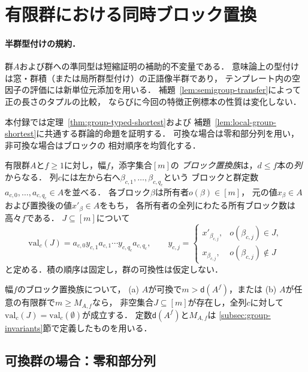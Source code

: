 \section{有限群における同時ブロック置換}
\label{app:group-blocks}

\paragraph{半群型付けの規約．}
群$A$および群への準同型は短縮証明の補助的不変量である．
意味論上の型付けは窓・群積（または局所群型付け）の正語像半群であり，
テンプレート内の空因子の評価には新単位元添加を用いる．
補題~\ref{lem:semigroup-transfer}によって正の長さのタプルの比較，
ならびに今回の特徴正例標本の性質は変化しない．

本付録では定理~\ref{thm:group-typed-shortest}および
補題~\ref{lem:local-group-shortest}に共通する群論的命題を証明する．
可換な場合は零和部分列を用い，非可換な場合はブロックの
相対順序を均質化する．

\begin{definition}[ブロック置換族]
\label{def:block-family}
有限群$A$と$f\ge1$に対し，幅$f$，添字集合$[m]$の
\emph{ブロック置換族}は，$d\le f$本の\emph{列}からなる．
列$c$には左から右へ$\beta_{c,1},\ldots,\beta_{c,q_c}$という
ブロックと群定数$a_{c,0},\ldots,a_{c,q_c}\in A$を並べる．
各ブロック$\beta$は所有者$o(\beta)\in[m]$，
元の値$x_\beta\in A$および置換後の値$x'_\beta\in A$をもち，
各所有者の全列にわたる所有ブロック数は高々$f$である．
$J\subseteq[m]$について
\[
 \mathrm{val}_c(J)=
 a_{c,0}y_{c,1}a_{c,1}\cdots y_{c,q_c}a_{c,q_c},
 \qquad
 y_{c,j}=
 \begin{cases}
 x'_{\beta_{c,j}},&o(\beta_{c,j})\in J,\\
 x_{\beta_{c,j}},&o(\beta_{c,j})\notin J
 \end{cases}
\]
と定める．積の順序は固定し，群の可換性は仮定しない．
\end{definition}

\begin{lemma}[同時ブロック置換]
\label{lem:block-replacement}
幅$f$のブロック置換族について，
(a) $A$が可換で$m>\mathsf d(A^f)$，または
(b) $A$が任意の有限群で$m\ge M_{A,f}$なら，
非空集合$J\subseteq[m]$が存在し，全列$c$に対して
$\mathrm{val}_c(J)=\mathrm{val}_c(\emptyset)$が成立する．
定数$\mathsf d(A^f)$と$M_{A,f}$は
\ref{subsec:group-invariants}節で定義したものを用いる．
\end{lemma}

\subsection{可換群の場合：零和部分列}
\label{app:window-abelian}

